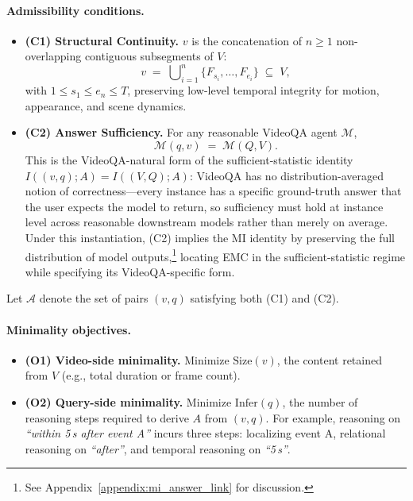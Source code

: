 \paragraph{Admissibility conditions.}
\begin{itemize}[leftmargin=*,topsep=2pt,itemsep=1pt]
    \item \textbf{(C1) Structural Continuity.} $v$ is the concatenation of $n \geq 1$ non-overlapping contiguous subsegments of $V$:
    \vspace{-0.2em}
    \[
    v \;=\; \bigcup\nolimits_{i=1}^{n} \{F_{s_i}, \ldots, F_{e_i}\} \;\subseteq\; V,
    \]
    with $1 \leq s_1 \leq e_n \leq T$, preserving low-level temporal integrity for motion, appearance, and scene dynamics.

    \item \textbf{(C2) Answer Sufficiency.} For any reasonable VideoQA agent $\mathcal{M}$,
    \vspace{-0.2em}
    \[
    \mathcal{M}(q, v) \;=\; \mathcal{M}(Q, V).
    \]
    This is the VideoQA-natural form of the sufficient-statistic identity $I((v,q); A) = I((V,Q); A)$: VideoQA has no distribution-averaged notion of correctness---every instance has a specific ground-truth answer that the user expects the model to return, so sufficiency must hold at instance level across reasonable downstream models rather than merely on average. Under this instantiation, (C2) implies the MI identity by preserving the full distribution of model outputs,\footnote{See Appendix~\ref{appendix:mi_answer_link} for discussion.} locating EMC in the sufficient-statistic regime while specifying its VideoQA-specific form.
\end{itemize}

\noindent Let $\mathcal{A}$ denote the set of pairs $(v, q)$ satisfying both (C1) and (C2).

\paragraph{Minimality objectives.}
\begin{itemize}[leftmargin=*,topsep=2pt,itemsep=1pt]
    \item \textbf{(O1) Video-side minimality.} Minimize $\mathrm{Size}(v)$, the content retained from $V$ (e.g., total duration or frame count).
    \item \textbf{(O2) Query-side minimality.} Minimize $\mathrm{Infer}(q)$, the number of reasoning steps required to derive $A$ from $(v, q)$. For example, reasoning on \textit{``within 5\,s after event A''} incurs three steps: localizing event A, relational reasoning on \textit{``after''}, and temporal reasoning on \textit{``5\,s''}.
\end{itemize}

